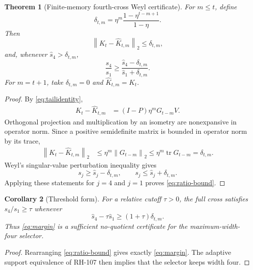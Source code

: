 \documentclass[11pt]{article}
\newtheorem{theorem}{Theorem}[section]
\newtheorem{corollary}[theorem]{Corollary}
\theoremstyle{definition}
\theoremstyle{remark}
\newcommand{\norm}[1]{\left\lVert#1\right\rVert}
\newcommand{\tr}{\operatorname{tr}}
\begin{document}
\begin{theorem}[Finite-memory fourth-cross Weyl certificate]
\label{thm:weyl}
For $m\le t$, define
\begin{equation}
 \delta_{t,m}
 =\eta^m\frac{1-\eta^{t-m+1}}{1-\eta}.
 \label{eq:delta}
\end{equation}
Then
\begin{equation}
 \norm{K_t-\widehat K_{t,m}}_2\le\delta_{t,m},
 \label{eq:crossperturbation}
\end{equation}
and, whenever $\widehat s_4>\delta_{t,m}$,
\begin{equation}
 \frac{s_4}{s_1}
 \ge
 \frac{\widehat s_4-\delta_{t,m}}
      {\widehat s_1+\delta_{t,m}}.
 \label{eq:ratio-bound}
\end{equation}
For $m=t+1$, take $\delta_{t,m}=0$ and $\widehat K_{t,m}=K_t$.
\end{theorem}

\begin{proof}
By \eqref{eq:tailidentity},
\begin{align*}
 K_t-\widehat K_{t,m}
 &=(I-P)\eta^mG_{t-m}V.
\end{align*}
Orthogonal projection and multiplication by an isometry are
nonexpansive in operator norm.  Since a positive semidefinite matrix is
bounded in operator norm by its trace,
\begin{align*}
 \norm{K_t-\widehat K_{t,m}}_2
 &\le\eta^m\norm{G_{t-m}}_2
 \le\eta^m\tr G_{t-m}
 =\delta_{t,m}.
\end{align*}
Weyl's singular-value perturbation inequality
\citep{Bhatia1997,StewartSun1990} gives
\begin{equation*}
 s_j\ge\widehat s_j-\delta_{t,m},
 \qquad
 s_j\le\widehat s_j+\delta_{t,m}.
\end{equation*}
Applying these statements for $j=4$ and $j=1$ proves
\eqref{eq:ratio-bound}.
\end{proof}

\begin{corollary}[Threshold form]
\label{cor:threshold}
For a relative cutoff $\tau>0$, the full cross satisfies
$s_4/s_1\ge\tau$ whenever
\begin{equation}
 \widehat s_4-\tau\widehat s_1
 \ge (1+\tau)\delta_{t,m}.
 \label{eq:margin}
\end{equation}
Thus \eqref{eq:margin} is a sufficient no-quotient certificate for the
maximum-width-four selector.
\end{corollary}

\begin{proof}
Rearranging \eqref{eq:ratio-bound} gives exactly \eqref{eq:margin}.
The adaptive support equivalence of RH-107 then implies that the selector
keeps width four.
\end{proof}
\end{document}
